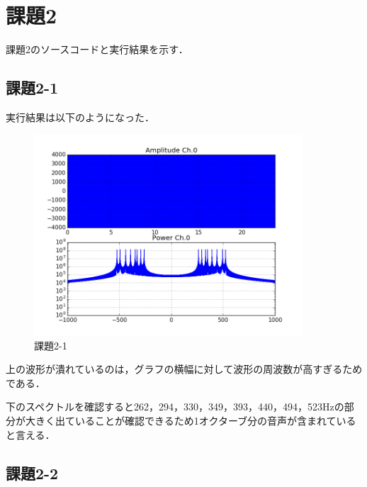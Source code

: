 \section{課題2}
課題2のソースコードと実行結果を示す．


\subsection{課題2-1}

実行結果は以下のようになった．

\begin{figure}[h]
  \begin{center}
    \includegraphics[width=10cm]{./img/kadai2-1.png}
    \caption{課題2-1}
  \end{center}
\end{figure}

上の波形が潰れているのは，グラフの横幅に対して波形の周波数が高すぎるためである．

下のスペクトルを確認すると262，294，330，349，393，440，494，523Hzの部分が大きく出ていることが確認できるため1オクターブ分の音声が含まれていると言える．


\subsection{課題2-2}

